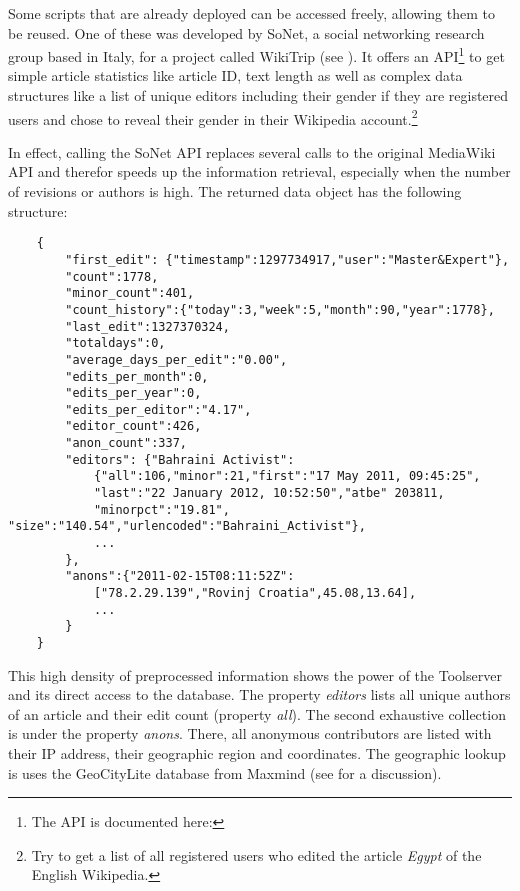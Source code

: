 Some scripts that are already deployed can be accessed freely, allowing them to be reused.
One of these was developed by SoNet, a social networking research group based in Italy, for a project called WikiTrip (see ).
It offers an API\footnote{The API is documented here: } to get simple article statistics like article ID, text length as well as complex data structures like a list of unique editors including their gender if they are registered users and chose to reveal their gender in their Wikipedia account.\footnote{Try  to get a list of all registered users who edited the article \emph{Egypt} of the English Wikipedia.}

In effect, calling the SoNet API replaces several calls to the original MediaWiki API and therefor speeds up the information retrieval, especially when the number of revisions or authors is high.
The returned data object has the following structure:

\begin{lstlisting}
	{
		"first_edit": {"timestamp":1297734917,"user":"Master&Expert"},
		"count":1778,
		"minor_count":401,
		"count_history":{"today":3,"week":5,"month":90,"year":1778},
		"last_edit":1327370324,
		"totaldays":0,
		"average_days_per_edit":"0.00",
		"edits_per_month":0,
		"edits_per_year":0,
		"edits_per_editor":"4.17",
		"editor_count":426,
		"anon_count":337,
		"editors": {"Bahraini Activist":
			{"all":106,"minor":21,"first":"17 May 2011, 09:45:25",
			"last":"22 January 2012, 10:52:50","atbe" 203811,
			"minorpct":"19.81", "size":"140.54","urlencoded":"Bahraini_Activist"},
			...
		},
		"anons":{"2011-02-15T08:11:52Z":
			["78.2.29.139","Rovinj Croatia",45.08,13.64],
			...
		}
	}
\end{lstlisting}

This high density of preprocessed information shows the power of the Toolserver and its direct access to the database.
The property \emph{editors} lists all unique authors of an article and their edit count (property \emph{all}).
The second exhaustive collection is under the property \emph{anons}. 
There, all anonymous contributors are listed with their IP address, their geographic region and coordinates.
The geographic lookup is uses the GeoCityLite database from Maxmind (see  for a discussion).

